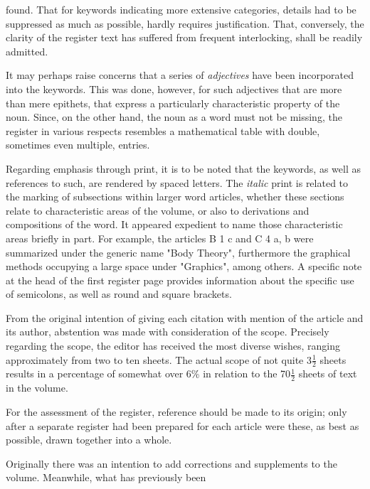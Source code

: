 \thispagestyle{fancy}

\vspace{0.5cm}

found. That for keywords indicating more extensive categories, details had to be suppressed as much as possible, hardly requires justification. That, conversely, the clarity of the register text has suffered from frequent interlocking, shall be readily admitted.

It may perhaps raise concerns that a series of \textit{adjectives} have been incorporated into the keywords. This was done, however, for such adjectives that are more than mere epithets, that express a particularly characteristic property of the noun. Since, on the other hand, the noun as a word must not be missing, the register in various respects resembles a mathematical table with double, sometimes even multiple, entries.

Regarding emphasis through print, it is to be noted that the keywords, as well as references to such, are rendered by spaced letters. The \textit{italic} print is related to the marking of subsections within larger word articles, whether these sections relate to characteristic areas of the volume, or also to derivations and compositions of the word. It appeared expedient to name those characteristic areas briefly in part. For example, the articles B 1 c and C 4 a, b were summarized under the generic name "Body Theory", furthermore the graphical methods occupying a large space under "Graphics", among others. A specific note at the head of the first register page provides information about the specific use of semicolons, as well as round and square brackets.

From the original intention of giving each citation with mention of the article and its author, abstention was made with consideration of the scope. Precisely regarding the scope, the editor has received the most diverse wishes, ranging approximately from two to ten sheets. The actual scope of not quite 3$\frac{1}{2}$ sheets results in a percentage of somewhat over 6\% in relation to the 70$\frac{1}{2}$ sheets of text in the volume.

For the assessment of the register, reference should be made to its origin; only after a separate register had been prepared for each article were these, as best as possible, drawn together into a whole.

Originally there was an intention to add corrections and supplements to the volume. Meanwhile, what has previously been
